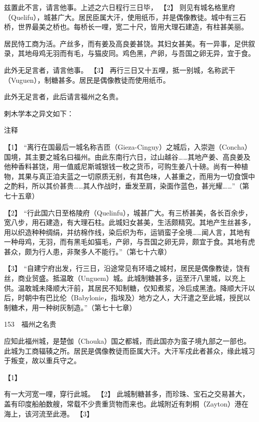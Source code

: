 \documentclass[12pt,UTF8]{ctexbook}
\begin{document}
兹置此不言，请言他事。上述之六日程行三日毕， 【2】 则见有城名格里府（Quelifu），城甚广大。居民臣属大汗，使用纸币，并是偶像教徒。城中有三石桥，世界最美之桥也。每桥长一哩，宽二十尺，皆用大理石建造，有柱甚美丽。

居民恃工商为活。产丝多，而有姜及高良姜甚饶。其妇女甚美。有一异事，足供叙录，其地母鸡无羽而有毛，与猫皮同。鸡色黑，产卵，与吾国之卵无异，宜于食。

此外无足言者，请言他事。 【3】 再行三日又十五哩，抵一别城，名称武干（Vuguen），制糖甚多。居民是偶像教徒而使用纸币。

此外无足言者，此后请言福州之名贵。

剌木学本之异文如下：

注释

【1】 “离行在国最后一城名称吉匝（Gieza-Cinguy）之城后，入崇迦（Concha）国境，其主要之城名曰福州。由此东南行六日，过山越谷……其地产姜、高良姜及他种香料甚饶，用一值威尼斯城银钱一枚之货币，可购生姜八十磅。尚有一种植物，其果与真正洎夫蓝之一切原质无别，有其色味，人甚重之，而用为一切食馔中之酌料，所以其价甚贵……其人作战时，垂发至肩，染面作蓝色，甚光耀……”（第七十五章）

【2】 “行此国六日至格陵府（Quelinfu），城甚广大。有三桥甚美，各长百余步，宽八步，用石建造，有大理石柱。此城妇女甚美，生活颇精究。其地产生丝甚多，用以织造种种绸绢，并纺棉作线，染后织为布，运销蛮子全境……闻人言，其地有一种母鸡，无羽，而有黑毛如猫毛，产卵，与吾国之卵无异，颇宜于食。其地有虎甚众，颇为行人患，非聚多人不能行。”（第七十六章）

【3】 “自建宁府出发，行三日，沿途常见有环墙之城村，居民是偶像教徒，饶有丝，商业贸盛。抵温敢（Unguem）城。此城制糖甚多，运至汗八里城，以充上供。温敢城未降顺大汗前，其居民不知制糖，仅知煮浆，冷后成黑渣。降顺大汗以后，时朝中有巴比伦（Babylonie，指埃及）地方之人，大汗遣之至此城，授民以制糖术，用一种树灰制造。”（第七十七章）





153　福州之名贵

应知此福州城，是楚伽（Chouka）国之都城，而此国亦为蛮子境九部之一部也。此城为工商辐辏之所。居民是偶像教徒而臣属大汗。大汗军戍此者甚众，缘此城习于叛变，故以重兵守之。





【1】


有一大河宽一哩，穿行此城。 【2】 此城制糖甚多，而珍珠、宝石之交易甚大，盖有印度船舶数艘，常载不少贵重货物而来也。此城附近有刺桐（Zayton）港在海上，该河流至此港。 【3】
\end{document}

